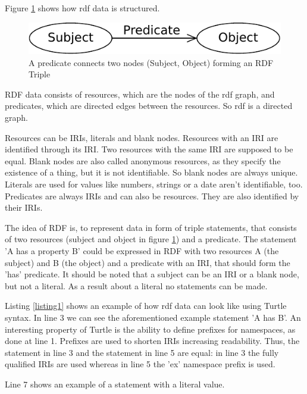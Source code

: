 Figure \ref{RdfTriple} shows how rdf data is structured.
\begin{figure}[H]
	\begin{center}
		\includegraphics[scale=0.75]{figures/rdf-graph.pdf}
	\end{center}
	\caption{A predicate connects two nodes (Subject, Object) forming an RDF Triple}
	\label{RdfTriple}
	\footnotemark
\end{figure}

RDF data consists of resources, which are the nodes of the rdf graph, and predicates, which are directed edges between the resources. So rdf is a directed graph. 

Resources can be IRIs, literals and blank nodes. 
Resources with an IRI are identified through its IRI. Two resources with the same IRI are supposed to be equal.
Blank nodes are also called anonymous resources, as they specify the existence of a thing, but it is not identifiable. So blank nodes are always unique.
Literals are used for values like numbers, strings or a date aren't identifiable, too.
Predicates are always IRIs and can also be resources. They are also identified by their IRIs.

The idea of RDF is, to represent data in form of triple statements, that consists of two resources (subject and object in figure \ref{RdfTriple}) and a predicate. The statement 'A has a property B' could be expressed in RDF with two resources A (the subject) and B (the object) and a predicate with an IRI, that should form the 'has' predicate. It should be noted that a subject can be an IRI or a blank node, but not a literal. As a result about a literal no statements can be made.

Listing \ref{listing1} shows an example of how rdf data can look like using Turtle syntax. In line 3 we can see the aforementioned example statement 'A has B'. An interesting property of Turtle is the ability to define prefixes for namespaces, as done at line 1. Prefixes are used to shorten IRIs increasing readability. Thus, the statement in line 3 and the statement in line 5 are equal: in line 3 the fully qualified IRIs are used whereas in line 5 the 'ex' namespace prefix is used.

Line 7 shows an example of a statement with a literal value.

